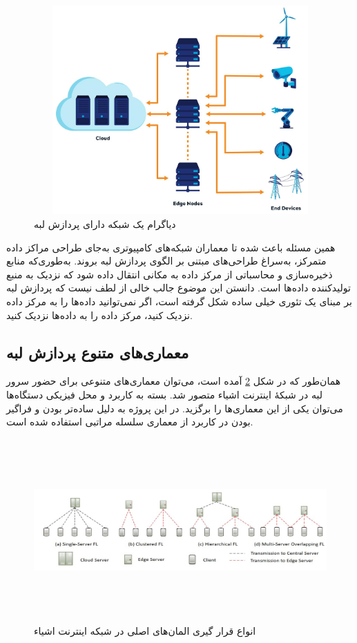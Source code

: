 \begin{figure}[H]
  \centering
  \includegraphics[height=8cm,width=13cm]{Edge/edge-computing-diagram.jpg}
  \caption{ دیاگرام یک شبکه دارای پردازش لبه}
  \label{Edge}
  \centering
\end{figure}

همین مسئله باعث شده تا معماران شبکه‌های کامپیوتری به‌جای طراحی مراکز داده متمرکز، به‌سراغ طراحی‌های مبتنی بر الگوی پردازش لبه بروند. به‌طوری‌که منابع ذخیره‌سازی و محاسباتی از مرکز داده به مکانی انتقال داده شود که نزدیک به منبع تولیدکننده داده‌ها است. دانستن این موضوع جالب خالی از لطف نیست که پردازش لبه بر مبنای یک تئوری خیلی ساده شکل گرفته است، اگر نمی‌توانید داده‌ها را به مرکز داده نزدیک کنید\cite{edge2}، مرکز داده را به داده‌ها نزدیک کنید.

\subsection{معماری‌های متنوع پردازش لبه}

همان‌طور که در شکل \ref{edge_arch} آمده است، می‌توان معماری‌های متنوعی برای حضور سرور لبه در شبکهٔ اینترنت اشیاء متصور شد. بسته به کاربرد و محل فیزیکی دستگاه‌ها می‌توان یکی از این معماری‌ها را برگزید. در این پروژه به دلیل ساده‌تر بودن و فراگیر بودن در کاربرد از معماری سلسله مراتبی استفاده شده است.

\begin{figure}[H]
  \centering
  \includegraphics[height=7cm,width=15cm]{./arch/edge.jpg}
  \caption[انواع قرار گیری المان‌های اصلی در شبکه اینترنت اشیاء]{ انواع قرار گیری المان‌های اصلی در شبکه اینترنت اشیاء\cite{a10}}
  \label{edge_arch}
  \centering
\end{figure}


